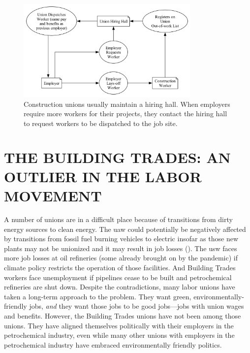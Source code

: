\documentclass[12pt]{article}
\newcommand{\imageWidth}{0.8\textwidth}
\begin{document}
\begin{figure}[ht]
  \centering
  \includegraphics[width=\imageWidth]{images/hiring_hall}
  \captionsetup{justification=centering, singlelinecheck=false, margin=2cm} 
  \caption[Union Hiring Hall]{Construction unions usually maintain a hiring hall. When employers require more workers for their projects, they contact the hiring hall to request workers to be dispatched to the job site.}
  \label{fig:hiring_hall}
\end{figure}

\section{THE BUILDING TRADES: AN OUTLIER IN THE LABOR MOVEMENT}

A number of unions are in a difficult place because of transitions from dirty energy sources to clean energy. The \acrfull{uaw} could potentially be negatively affected by transitions from fossil fuel burning vehicles to electric insofar as those new plants may not be unionized and it may result in job losses (\cite{feeleyElectricVehicleFactories2023}). The \acrfull{usw} faces more job losses at oil refineries (some already brought on by the pandemic) if climate policy restricts the operation of those facilities. And Building Trades workers face unemployment if pipelines cease to be built and petrochemical refineries are shut down. Despite the contradictions, many labor unions have taken a long-term approach to the problem. They want green, environmentally-friendly jobs, \emph{and} they want those jobs to be good jobs---jobs with union wages and benefits. However, the Building Trades unions have not been among those unions. They have aligned themselves politically with their employers in the petrochemical industry, even while many other unions with employers in the petrochemical industry have embraced environmentally friendly politics.
\end{document}
